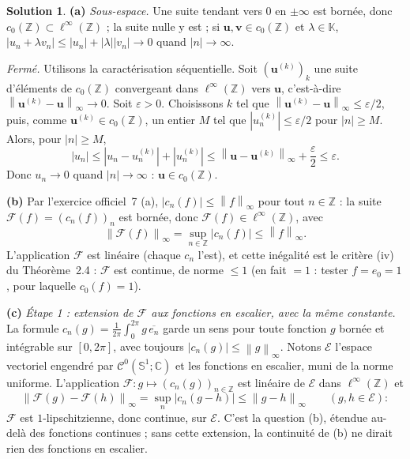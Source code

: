\documentclass[11pt,a4paper]{article}
\newcommand{\Z}{\mathbb{Z}}
\newcommand{\C}{\mathbb{C}}
\newcommand{\K}{\mathbb{K}}
\newcommand{\Sun}{\mathbb{S}^1}
\newcommand{\norm}[1]{\left\|#1\right\|}
\newcommand{\Cz}{\mathcal{C}^0}
\newcommand{\ie}{c'est-à-dire}
\theoremstyle{definition}
\newtheorem*{solution}{Solution}
\begin{document}
\begin{solution}
\noindent\textbf{(a)} \emph{Sous-espace.} Une suite tendant vers $0$ en $\pm\infty$ est bornée, donc $c_0(\Z)\subset\ell^\infty(\Z)$ ; la suite nulle y est ; si $\mathbf u,\mathbf v\in c_0(\Z)$ et $\lambda\in\K$, $|u_n+\lambda v_n|\le|u_n|+|\lambda||v_n|\to0$ quand $|n|\to\infty$.

\emph{Fermé.} Utilisons la caractérisation séquentielle. Soit $(\mathbf u^{(k)})_k$ une suite d'éléments de $c_0(\Z)$ convergeant dans $\ell^\infty(\Z)$ vers $\mathbf u$, \ie{} $\norm{\mathbf u^{(k)}-\mathbf u}_\infty\to0$. Soit $\varepsilon>0$. Choisissons $k$ tel que $\norm{\mathbf u^{(k)}-\mathbf u}_\infty\le\varepsilon/2$, puis, comme $\mathbf u^{(k)}\in c_0(\Z)$, un entier $M$ tel que $|u^{(k)}_n|\le\varepsilon/2$ pour $|n|\ge M$. Alors, pour $|n|\ge M$,
\[
|u_n|\le|u_n-u^{(k)}_n|+|u^{(k)}_n|\le\norm{\mathbf u-\mathbf u^{(k)}}_\infty+\frac\varepsilon2\le\varepsilon .
\]
Donc $u_n\to0$ quand $|n|\to\infty$ : $\mathbf u\in c_0(\Z)$.

\medskip
\noindent\textbf{(b)} Par l'exercice officiel~7 (a), $|c_n(f)|\le\norm f_\infty$ pour tout $n\in\Z$ : la suite $\mathcal F(f)=(c_n(f))_n$ est bornée, donc $\mathcal F(f)\in\ell^\infty(\Z)$, avec
\[
\norm{\mathcal F(f)}_\infty=\sup_{n\in\Z}|c_n(f)|\le\norm f_\infty .
\]
L'application $\mathcal F$ est linéaire (chaque $c_n$ l'est), et cette inégalité est le critère (iv) du Théorème~2.4 : $\mathcal F$ est continue, de norme $\le1$ (en fait $=1$ : tester $f=e_0=1$, pour laquelle $c_0(f)=1$).

\medskip
\noindent\textbf{(c)} \emph{Étape 1 : extension de $\mathcal F$ aux fonctions en escalier, avec la même constante.} La formule $c_n(g)=\frac1{2\pi}\int_0^{2\pi}g\,\overline{e_n}$ garde un sens pour toute fonction $g$ bornée et intégrable sur $[0,2\pi]$, avec toujours $|c_n(g)|\le\norm g_\infty$. Notons $\mathcal E$ l'espace vectoriel engendré par $\Cz(\Sun;\C)$ et les fonctions en escalier, muni de la norme uniforme. L'application $\mathcal F:g\mapsto(c_n(g))_{n\in\Z}$ est linéaire de $\mathcal E$ dans $\ell^\infty(\Z)$ et
\begin{equation}\label{eq:lip}
\norm{\mathcal F(g)-\mathcal F(h)}_\infty=\sup_n|c_n(g-h)|\le\norm{g-h}_\infty\qquad(g,h\in\mathcal E):
\end{equation}
$\mathcal F$ est $1$-lipschitzienne, donc continue, sur $\mathcal E$. C'est la question (b), étendue au-delà des fonctions continues ; sans cette extension, la continuité de (b) ne dirait rien des fonctions en escalier.


\end{solution}
\end{document}
